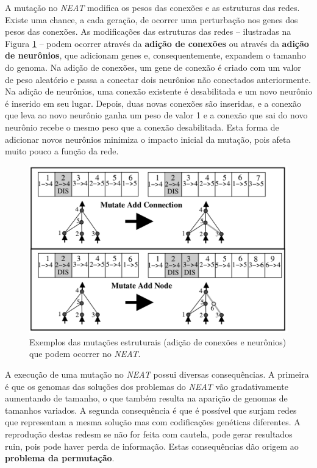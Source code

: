 A mutação no \textit{NEAT} modifica os pesos das conexões e as estruturas das
redes. Existe uma chance, a cada geração, de ocorrer uma perturbação nos genes
dos pesos das conexões. As modificações das estruturas das redes -- ilustradas
na Figura \ref{fig:neat-structural-mutation} -- podem ocorrer através da
\textbf{adição de conexões} ou através da \textbf{adição de neurônios}, que
adicionam genes e, consequentemente, expandem o tamanho do genoma. Na adição de
conexões, um gene de conexão é criado com um valor de peso aleatório e passa a
conectar dois neurônios não conectados anteriormente. Na adição de neurônios,
uma conexão existente é desabilitada e um novo neurônio é inserido em seu lugar.
Depois, duas novas conexões são inseridas, e a conexão que leva ao novo neurônio
ganha um peso de valor 1 e a conexão que sai do novo neurônio recebe o mesmo
peso que a conexão desabilitada. Esta forma de adicionar novos neurônios
minimiza o impacto inicial da mutação, pois afeta muito pouco a função da rede.

\begin{figure}[H]
\centering
\includegraphics[width=\textwidth]{fig/neat-mutation-examples.pdf}
\caption{Exemplos das mutações estruturais (adição de conexões e neurônios) que
podem ocorrer no \textit{NEAT}.}
\label{fig:neat-structural-mutation}
\end{figure}


A execução de uma mutação no \textit{NEAT} possui diversas consequências. A
primeira é que os genomas das soluções dos problemas do \textit{NEAT} vão
gradativamente aumentando de tamanho, o que também resulta na aparição de
genomas de tamanhos variados. A segunda consequência é que é possível que surjam
redes que representam a mesma solução mas com codificações genéticas diferentes.
A reprodução destas redesm se não for feita com cautela, pode gerar resultados
ruin, pois pode haver perda de informação. Estas consequências dão origem ao
\textbf{problema da permutação}.

